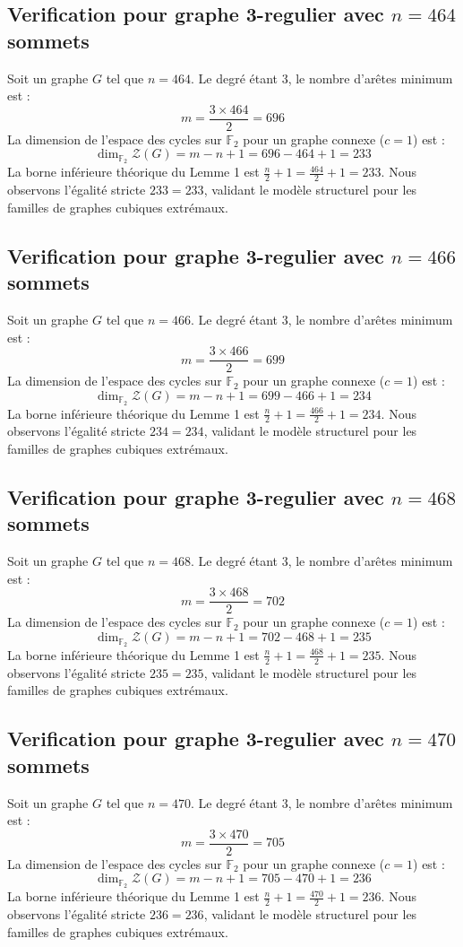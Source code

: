 \documentclass[11pt,a4paper]{article}
\begin{document}
\subsection{Verification pour graphe 3-regulier avec $n=464$ sommets}
Soit un graphe $G$ tel que $n = 464$. Le degré étant 3, le nombre d'arêtes minimum est :
$$ m = \frac{3 \times 464}{2} = 696 $$
La dimension de l'espace des cycles sur $\mathbb{F}_2$ pour un graphe connexe ($c=1$) est :
$$ \dim_{\mathbb{F}_2} \mathcal{Z}(G) = m - n + 1 = 696 - 464 + 1 = 233 $$
La borne inférieure théorique du Lemme 1 est $\frac{n}{2} + 1 = \frac{464}{2} + 1 = 233$.
Nous observons l'égalité stricte $233 = 233$, validant le modèle structurel pour les familles de graphes cubiques extrémaux.

\subsection{Verification pour graphe 3-regulier avec $n=466$ sommets}
Soit un graphe $G$ tel que $n = 466$. Le degré étant 3, le nombre d'arêtes minimum est :
$$ m = \frac{3 \times 466}{2} = 699 $$
La dimension de l'espace des cycles sur $\mathbb{F}_2$ pour un graphe connexe ($c=1$) est :
$$ \dim_{\mathbb{F}_2} \mathcal{Z}(G) = m - n + 1 = 699 - 466 + 1 = 234 $$
La borne inférieure théorique du Lemme 1 est $\frac{n}{2} + 1 = \frac{466}{2} + 1 = 234$.
Nous observons l'égalité stricte $234 = 234$, validant le modèle structurel pour les familles de graphes cubiques extrémaux.

\subsection{Verification pour graphe 3-regulier avec $n=468$ sommets}
Soit un graphe $G$ tel que $n = 468$. Le degré étant 3, le nombre d'arêtes minimum est :
$$ m = \frac{3 \times 468}{2} = 702 $$
La dimension de l'espace des cycles sur $\mathbb{F}_2$ pour un graphe connexe ($c=1$) est :
$$ \dim_{\mathbb{F}_2} \mathcal{Z}(G) = m - n + 1 = 702 - 468 + 1 = 235 $$
La borne inférieure théorique du Lemme 1 est $\frac{n}{2} + 1 = \frac{468}{2} + 1 = 235$.
Nous observons l'égalité stricte $235 = 235$, validant le modèle structurel pour les familles de graphes cubiques extrémaux.

\subsection{Verification pour graphe 3-regulier avec $n=470$ sommets}
Soit un graphe $G$ tel que $n = 470$. Le degré étant 3, le nombre d'arêtes minimum est :
$$ m = \frac{3 \times 470}{2} = 705 $$
La dimension de l'espace des cycles sur $\mathbb{F}_2$ pour un graphe connexe ($c=1$) est :
$$ \dim_{\mathbb{F}_2} \mathcal{Z}(G) = m - n + 1 = 705 - 470 + 1 = 236 $$
La borne inférieure théorique du Lemme 1 est $\frac{n}{2} + 1 = \frac{470}{2} + 1 = 236$.
Nous observons l'égalité stricte $236 = 236$, validant le modèle structurel pour les familles de graphes cubiques extrémaux.
\end{document}
